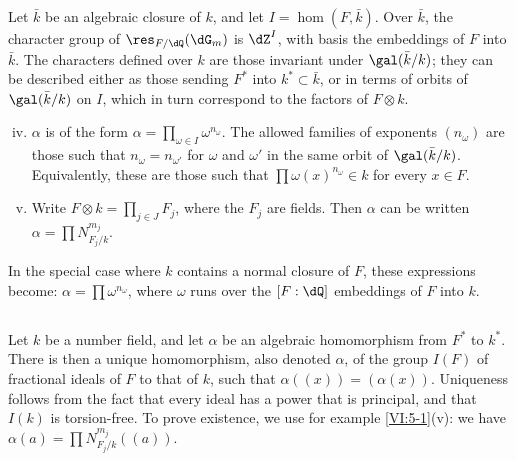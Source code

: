 Let $\bar k$ be an algebraic closure of $k$, and let $I=\hom(F,\bar k)$. Over 
$\bar k$, the character group of $\res_{F/\dQ}(\dG_m)$ is $\dZ^I$, with basis 
the embeddings of $F$ into $\bar k$. The characters defined over $k$ 
are those invariant under $\gal(\bar k/k)$; they can be described either as 
those sending $F^\ast$ into $k^\ast\subset \bar k$, or in terms of 
orbits of $\gal(\bar k/k)$ on $I$, which in turn correspond to the factors of 
$F\otimes k$. 
\begin{enumerate}[(i)]
\setcounter{enumi}{3}
  \item $\alpha$ is of the form 
    $\alpha=\prod_{\omega\in I} \omega^{n_\omega}$. The allowed families of exponents 
    $(n_\omega)$ are those such that $n_\omega=n_{\omega'}$ for 
    $\omega$ and $\omega'$ in the same orbit of $\gal(\bar k/k)$. Equivalently, these 
    are those such that $\prod \omega(x)^{n_\omega}\in k$ for every 
    $x\in F$. 
  
\item {}Write $F\otimes k=\prod_{j\in J} F_j$, where the $F_j$ are fields. 
    Then $\alpha$ can be written $\alpha=\prod N_{F_j/k}^{m_j}$. 
\end{enumerate}

In the special case where $k$ contains a normal closure of $F$, these 
expressions become: $\alpha=\prod \omega^{n_\omega}$, where $\omega$ 
runs over the $[F:\dQ]$ embeddings of $F$ into $k$. 





\subsection{}\label{VI:5-2}

Let $k$ be a number field, and let $\alpha$ be an algebraic homomorphism 
from $F^\ast$ to $k^\ast$. There is then a unique 
homomorphism, also denoted $\alpha$, of the group $I(F)$ 
of fractional ideals of $F$ to that of $k$, such that $\alpha((x))=(\alpha(x))$. 
Uniqueness follows from the fact that every ideal has a power that is 
principal, and that $I(k)$ is torsion-free. To prove 
existence, we use for example \ref{VI:5-1}(v): we have 
$\alpha(a) = \prod N_{F_j/k}^{m_j}((a))$. 





\subsection{}\label{VI:5-3}

